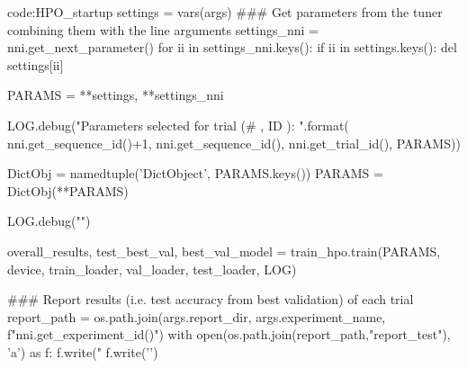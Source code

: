 \begin{mycodebox}{code:HPO_startup}
        settings = vars(args)
        ### Get parameters from the tuner combining them with the line arguments
        settings_nni = nni.get_next_parameter()
        for ii in settings_nni.keys():
            if ii in settings.keys():
                del settings[ii]
    
        PARAMS = {**settings, **settings_nni}

        LOG.debug("Parameters selected for trial {} (# {}, ID {}): {}\n".format(
            nni.get_sequence_id()+1, nni.get_sequence_id(), nni.get_trial_id(), PARAMS))

        DictObj = namedtuple('DictObject', PARAMS.keys())
        PARAMS = DictObj(**PARAMS)
    
        LOG.debug("\n")

        overall_results, test_best_val, best_val_model = train_hpo.train(PARAMS, device, train_loader, val_loader, test_loader, LOG)
        
        ### Report results (i.e. test accuracy from best validation) of each trial
        report_path = os.path.join(args.report_dir,
            args.experiment_name,
            f"{nni.get_experiment_id()}")
        with open(os.path.join(report_path,"report_test"), 'a') as f:
            f.write("{} %
            f.write('\n')
        

\end{mycodebox}
